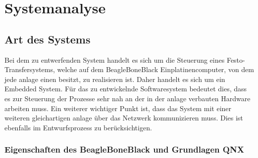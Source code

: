 




























\section{Systemanalyse}\label{sec:systemanalyse}


\subsection{Art des Systems}

Bei dem zu entwerfenden System handelt es sich um die Steuerung eines Festo-Transfersystems,
welche auf dem BeagleBoneBlack Einplatinencomputer, von dem jede \gls{anlage} einen besitzt, zu realisieren ist.
Daher handelt es sich um ein Embedded System.
Für das zu entwickelnde Softwaresystem bedeutet dies, dass es zur Steuerung der Prozesse sehr nah
an der in der \gls{anlage} verbauten Hardware arbeiten muss.
Ein weiterer wichtiger Punkt ist, dass das System mit einer weiteren gleichartigen \gls{anlage} über
das Netzwerk kommunizieren muss. Dies ist ebenfalls im Entwurfsprozess zu berücksichtigen.

\subsubsection{Eigenschaften des BeagleBoneBlack und Grundlagen QNX}

